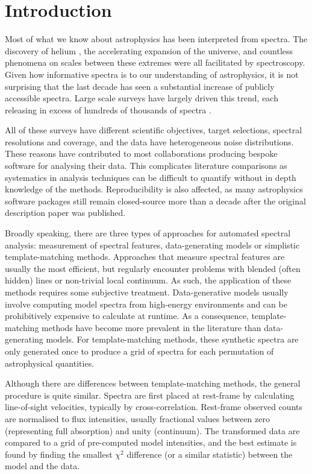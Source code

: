 \documentclass{aastex}
\begin{document}
\section{Introduction}
Most of what we know about astrophysics has been interpreted from spectra. The discovery of helium \citep{who}, the accelerating expansion of the universe, and countless phenomena on scales between these extremes were all facilitated by spectroscopy. Given how informative spectra is to our understanding of astrophysics, it is not surprising that the last decade has seen a substantial increase of publicly accessible spectra. Large scale surveys have largely driven this trend, each releasing in excess of hundreds of thousands of spectra \citep[e.g.,][]{wigglez,boss,segue,rave}.
 
 All of these surveys have different scientific objectives, target selections, spectral resolutions and coverage, and the data have heterogeneous noise distributions. These reasons have contributed to most collaborations producing bespoke software for analysing their data. This complicates literature comparisons as systematics in analysis techniques can be difficult to quantify without in depth knowledge of the methods. Reproducibility is also affected, as many astrophysics software packages still remain closed-source more than a decade after the original description paper was published. 

Broadly speaking, there are three types of approaches for automated spectral analysis: measurement of spectral features, data-generating models or simplistic template-matching methods. Approaches that measure spectral features are usually the most efficient, but regularly encounter problems with blended (often hidden) lines or non-trivial local continuum. As such, the application of these methods requires some subjective treatment. Data-generative models usually involve computing model spectra from high-energy environments and can be prohibitively expensive to calculate at runtime. As a consequence, template-matching methods have become more prevalent in the literature than data-generating models. For template-matching methods, these synthetic spectra are only generated once to produce a grid of spectra for each permutation of astrophysical quantities.

Although there are differences between template-matching methods, the general procedure is quite similar. Spectra are first placed at rest-frame by calculating line-of-sight velocities, typically by cross-correlation. Rest-frame observed counts are normalised to flux intensities, usually fractional values between zero (representing full absorption) and unity (continuum). The transformed data are compared to a grid of pre-computed model intensities, and the best estimate is found by finding the smallest $\chi^2$ difference (or a similar statistic) between the model and the data. 
\end{document}
